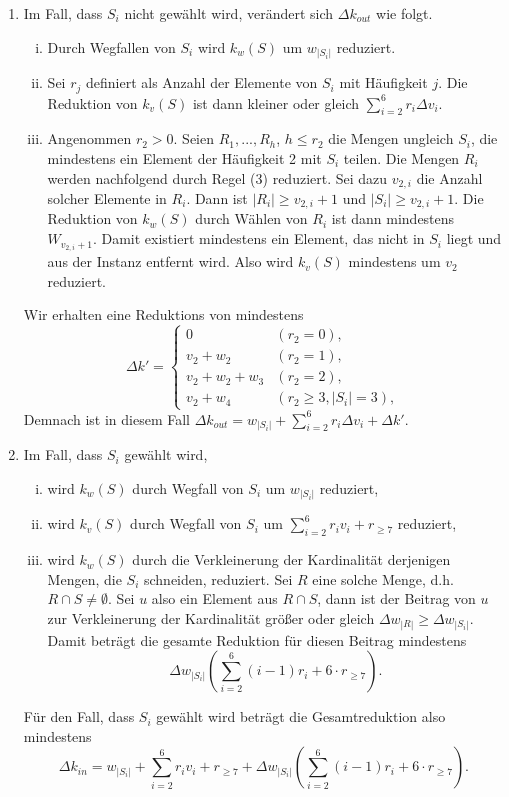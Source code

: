   \begin{enumerate}[(1)]
   \item Im Fall, dass \(S_i\) nicht gewählt wird, verändert sich \(\Delta k_{out}\) wie folgt.
          \begin{enumerate}[(i)]
            \item Durch Wegfallen von \(S_i\) wird \(k_w(S)\) um \(w_{|S_i|}\) reduziert.
            \item Sei \(r_j\) definiert als Anzahl der Elemente von \(S_i\) mit Häufigkeit \(j\). Die Reduktion von \(k_v(S)\) ist dann kleiner oder gleich \(\sum_{i=2}^6 r_i \Delta v_i\).
            \item Angenommen \(r_2 > 0\). Seien \(R_1, ..., R_h\), \(h \leq r_2\) die Mengen ungleich \(S_i\), die mindestens ein Element der Häufigkeit 2 mit \(S_i\) teilen. Die Mengen \(R_i\) werden nachfolgend durch Regel (3) reduziert. Sei dazu \(v_{2,i}\) die Anzahl solcher Elemente in \(R_i\). Dann ist \(|R_i| \geq v_{2,i}+1\) und \(|S_i| \geq v_{2,i} + 1\). Die Reduktion von \(k_w(S)\) durch Wählen von \(R_i\) ist dann mindestens \(W_{v_{2,i}+1}\). Damit existiert mindestens ein Element, das nicht in \(S_i\) liegt und aus der Instanz entfernt wird. Also wird \(k_v(S)\) mindestens um \(v_2\) reduziert.
          \end{enumerate}
          Wir erhalten eine Reduktions von mindestens
          \[
           \Delta k' =
           \begin{cases}
             0 & (r_2 = 0), \\
             v_2 + w_2 & (r_2 = 1), \\
             v_2 + w_2 + w_3 & (r_2 = 2), \\
             v_2 + w_4 & (r_2 \geq 3, |S_i| = 3),
           \end{cases}
          \]
          Demnach ist in diesem Fall \(\Delta k_{out} = w_{|S_i|} + \sum_{i=2}^6 r_i \Delta v_i + \Delta k'\).
   \item Im Fall, dass \(S_i\) gewählt wird,
          \begin{enumerate}[(i)]
           \item wird \(k_w(S)\) durch Wegfall von \(S_i\) um \(w_{|S_i|}\) reduziert,
           \item wird \(k_v(S)\) durch Wegfall von \(S_i\) um \(\sum_{i=2}^6 r_iv_i + r_{\geq 7}\) reduziert,
           \item wird \(k_w(S)\) durch die Verkleinerung der Kardinalität derjenigen Mengen, die \(S_i\) schneiden, reduziert. Sei \(R\) eine solche Menge, d.h. \(R \cap S \neq \emptyset\). Sei \(u\) also ein Element aus \(R \cap S\), dann ist der Beitrag von \(u\) zur Verkleinerung der Kardinalität größer oder gleich \(\Delta w_{|R|} \geq \Delta w_{|S_i|}\). Damit beträgt die gesamte Reduktion für diesen Beitrag mindestens \[ \Delta w_{|S_i|} \left( \sum_{i=2}^6 (i-1)r_i + 6 \cdot r_{\geq 7} \right). \]
          \end{enumerate}
         Für den Fall, dass \(S_i\) gewählt wird beträgt die Gesamtreduktion also mindestens
         \[
           \Delta k_{in} = w_{|S_i|} + \sum_{i=2}^6 r_iv_i + r_{\geq 7} + \Delta w_{|S_i|} \left( \sum_{i=2}^6 (i-1)r_i + 6 \cdot r_{\geq 7} \right).
         \]
  \end{enumerate}

